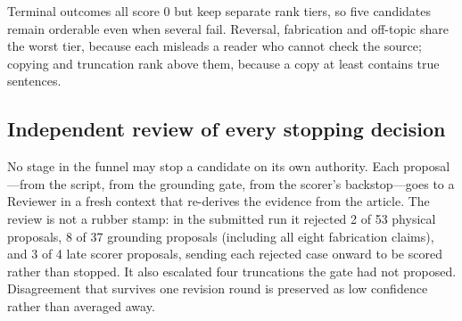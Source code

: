 \documentclass[conference]{IEEEtran}
\begin{document}
Terminal outcomes all score 0 but keep separate rank tiers, so five
candidates remain orderable even when several fail. Reversal,
fabrication and off-topic share the worst tier, because each misleads a
reader who cannot check the source; copying and truncation rank above
them, because a copy at least contains true sentences.

\subsection{Independent review of every stopping decision}
No stage in the funnel may stop a candidate on its own authority. Each
proposal---from the script, from the grounding gate, from the scorer's
backstop---goes to a Reviewer in a fresh context that re-derives the
evidence from the article. The review is not a rubber stamp: in the
submitted run it rejected 2 of 53 physical proposals, 8 of 37 grounding
proposals (including all eight fabrication claims), and 3 of 4 late
scorer proposals, sending each rejected case onward to be scored rather
than stopped. It also escalated four truncations the gate had not
proposed. Disagreement that survives one revision round is preserved as
low confidence rather than averaged away.
\end{document}
